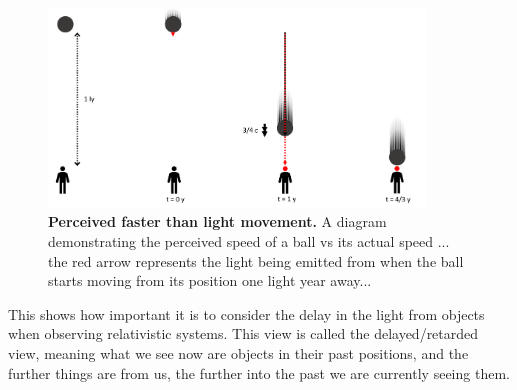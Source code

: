 \begin{figure}[H]
	\centering
	\includegraphics[width = 10cm]{images/pdf/Perceived_speed.pdf}
	\caption{\textbf{Perceived faster than light movement.} A diagram demonstrating the perceived speed of a ball vs its actual speed ... the red arrow represents the light being emitted from when the ball starts moving from its position one light year away...}
	\label{fig: perceived vs actual speed}
\end{figure}

This shows how important it is to consider the delay in the light from objects when observing relativistic systems.
This view is called the delayed/retarded view, meaning what we see now are objects in their past positions, and the further things are from us, the further into the past we are currently seeing them.






